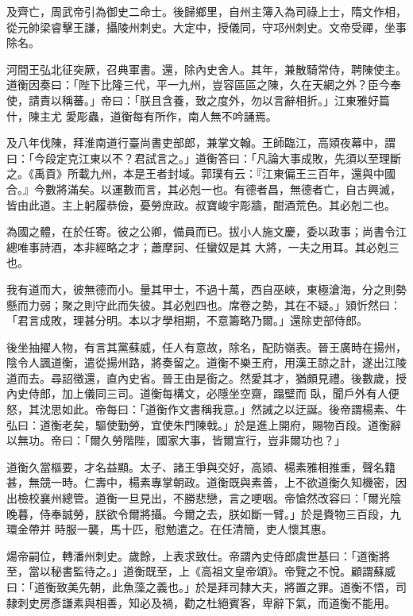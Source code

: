 \begin{pinyinscope}
 及齊亡，周武帝引為御史二命士。後歸鄉里，自州主簿入為司祿上士，隋文作相，從元帥梁睿擊王謙，攝陵州刺史。大定中，授儀同，守邛州刺史。文帝受禪，坐事除名。



 河間王弘北征突厥，召典軍書。還，除內史舍人。其年，兼散騎常侍，聘陳使主。道衡因奏曰：「陛下比隆三代，平一九州，豈容區區之陳，久在天網之外？臣今奉使，請責以稱蕃。」帝曰：「朕且含養，致之度外，勿以言辭相折。」江東雅好篇什，陳主尤
 愛彫蟲，道衡每有所作，南人無不吟誦焉。



 及八年伐陳，拜淮南道行臺尚書吏部郎，兼掌文翰。王師臨江，高熲夜幕中，謂曰：「今段定克江東以不？君試言之。」道衡答曰：「凡論大事成敗，先須以至理斷之。《禹貢》所載九州，本是王者封域。郭璞有云：『江東偏王三百年，還與中國合。』今數將滿矣。以運數而言，其必剋一也。有德者昌，無德者亡，自古興滅，皆由此道。主上躬履恭儉，憂勞庶政。叔寶峻宇彫牆，酣酒荒色。其必剋二也。



 為國之體，在於任寄。彼之公卿，備員而已。拔小人施文慶，委以政事；尚書令江總唯事詩酒，本非經略之才；蕭摩訶、任蠻奴是其
 大將，一夫之用耳。其必剋三也。



 我有道而大，彼無德而小。量其甲士，不過十萬，西自巫峽，東極滄海，分之則勢懸而力弱；聚之則守此而失彼。其必剋四也。席卷之勢，其在不疑。」熲忻然曰：「君言成敗，理甚分明。本以才學相期，不意籌略乃爾。」還除吏部侍郎。



 後坐抽擢人物，有言其黨蘇威，任人有意故，除名，配防嶺表。晉王廣時在揚州，陰令人諷道衡，遣從揚州路，將奏留之。道衡不樂王府，用漢王諒之計，遂出江陵道而去。尋詔徵還，直內史省。晉王由是銜之。然愛其才，猶頗見禮。後數歲，授內史侍郎，加上儀同三司。道衡每構文，必隱坐空齋，蹋壁而
 臥，聞戶外有人便怒，其沈思如此。帝每曰：「道衡作文書稱我意。」然誡之以迂誕。後帝謂楊素、牛弘曰：道衡老矣，驅使勤勞，宜使朱門陳戟。」於是進上開府，賜物百段。道衡辭以無功。帝曰：「爾久勞階陛，國家大事，皆爾宣行，豈非爾功也？」



 道衡久當樞要，才名益顯。太子、諸王爭與交好，高熲、楊素雅相推重，聲名籍甚，無競一時。仁壽中，楊素專掌朝政。道衡既與素善，上不欲道衡久知機密，因出檢校襄州總管。道衡一旦見出，不勝悲戀，言之哽咽。帝愴然改容曰：「爾光陰晚暮，侍奉誠勞，朕欲令爾將攝。今爾之去，朕如斷一臂。」於是賚物三百段，九環金帶并
 時服一襲，馬十匹，慰勉遣之。在任清簡，吏人懷其惠。



 煬帝嗣位，轉潘州刺史。歲餘，上表求致仕。帝謂內史侍郎虞世基曰：「道衡將至，當以秘書監待之。」道衡既至，上《高祖文皇帝頌》。帝覽之不悅。顧謂蘇威曰：「道衡致美先朝，此魚藻之義也。」於是拜司隸大夫，將置之罪。道衡不悟，司隸刺史房彥謙素與相善，知必及禍，勸之杜絕賓客，卑辭下氣，而道衡不能用。




\end{pinyinscope}
